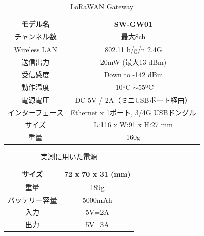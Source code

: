\begin{table}[]
    \caption{LoRaWAN Gateway}\label{fig:LoRaWAN_Gateway_Spec}
    \centering
    \begin{tabular}{|c|c|}
    \hline
    モデル名         & SW-GW01                       \\ \hline
    チャンネル数       & 最大8ch                         \\ \hline
    Wireless LAN & 802.11 b/g/n 2.4G             \\ \hline
    送信出力         & 20mW (最大13 dBm)               \\ \hline
    受信感度         & Down to -142 dBm              \\ \hline
    動作温度         & -10ºC $\sim$55ºC              \\ \hline
    電源電圧         & DC 5V / 2A（ミニUSBポート経由）        \\ \hline
    インターフェース     & Ethernet x 1ポート, 3/4G USBドングル \\ \hline
    サイズ          & L:116 x W:91 x H:27 mm        \\ \hline
    重量           & 160g                          \\ \hline
    \end{tabular}
\end{table}

\begin{table}[]
    \caption{実測に用いた電源}\label{fig:LoRaWAN_Battery}
    \centering
    \begin{tabular}{|c|c|}
    \hline
    サイズ     & 72 x 70 x 31 (mm) \\ \hline
    重量      & 189g              \\ \hline
    バッテリー容量 & 5000mAh           \\ \hline
    入力      & 5V=2A             \\ \hline
    出力      & 5V=3A             \\ \hline
    \end{tabular}
\end{table}

